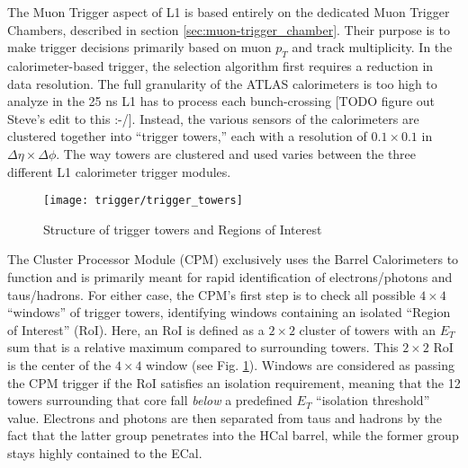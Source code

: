         The Muon Trigger aspect of L1 is based entirely on the dedicated Muon Trigger Chambers, described in section \ref{sec:muon-trigger_chamber}.
        Their purpose is to make trigger decisions primarily based on muon $p_T$ and track multiplicity\cite{trigger_run1}.
        In the calorimeter-based trigger, the selection algorithm first requires a reduction in data resolution.
        The full granularity of the ATLAS calorimeters is too high to analyze in the 25 ns L1 has to process each bunch-crossing
            [TODO figure out Steve's edit to this :-/].
        Instead, the various sensors of the calorimeters are clustered together into ``trigger towers,''
            each with a resolution of $0.1 \times 0.1$ in $\Delta \eta \times \Delta \phi$.
        The way towers are clustered and used varies between the three different L1 calorimeter trigger modules.

        \begin{figure}[h]
            \texttt{[image: trigger/trigger\_towers]}
            \caption{Structure of trigger towers and Regions of Interest \cite{L1_calo_run1}}
            \label{fig:trigger_towers}
        \end{figure}


        The Cluster Processor Module (CPM) exclusively uses the Barrel Calorimeters to function
            and is primarily meant for rapid identification of electrons/photons and taus/hadrons.
        For either case, the CPM's first step is to check all possible $4 \times 4$ ``windows'' of trigger towers, identifying windows containing an isolated ``Region of Interest'' (RoI).
        Here, an RoI is defined as a $2 \times 2$ cluster of towers with an $E_T$ sum that is a relative maximum compared to surrounding towers.
        This $2 \times 2$ RoI is the center of the $4 \times 4$ window (see Fig. \ref{fig:trigger_towers}).
        Windows are considered as passing the CPM trigger if the RoI satisfies an isolation requirement, meaning that the 12 towers surrounding that core fall \textit{below} a predefined $E_T$ ``isolation threshold'' value.
        Electrons and photons are then separated from taus and hadrons by the fact that the latter group penetrates into the HCal barrel, while the former group stays highly contained to the ECal.

